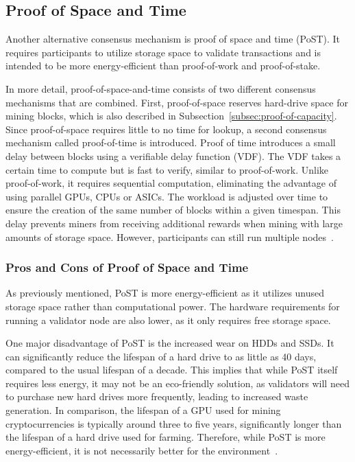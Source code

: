 \subsection{Proof of Space and Time}\label{subsec:proof-of-space-and-time}
Another alternative consensus mechanism is proof of space and time (PoST).
It requires participants to utilize storage space to validate transactions and is intended to be more energy-efficient than proof-of-work and proof-of-stake.

In more detail, proof-of-space-and-time consists of two different consensus mechanisms that are combined.
First, proof-of-space reserves hard-drive space for mining blocks, which is also described in Subsection~\ref{subsec:proof-of-capacity}.
Since proof-of-space requires little to no time for lookup, a second consensus mechanism called proof-of-time is introduced.
Proof of time introduces a small delay between blocks using a verifiable delay function (VDF).
The VDF takes a certain time to compute but is fast to verify, similar to proof-of-work.
Unlike proof-of-work, it requires sequential computation, eliminating the advantage of using parallel GPUs, CPUs or ASICs.
The workload is adjusted over time to ensure the creation of the same number of blocks within a given timespan.
This delay prevents miners from receiving additional rewards when mining with large amounts of storage space.
However, participants can still run multiple nodes~\cite{supraoracles-post,chia-whitepaper}.

\subsubsection{Pros and Cons of Proof of Space and Time}
As previously mentioned, PoST is more energy-efficient as it utilizes unused storage space rather than computational power.
The hardware requirements for running a validator node are also lower, as it only requires free storage space.

One major disadvantage of PoST is the increased wear on HDDs and SSDs.
It can significantly reduce the lifespan of a hard drive to as little as 40 days, compared to the usual lifespan of a decade.
This implies that while PoST itself requires less energy, it may not be an eco-friendly solution, as validators will need to purchase new hard drives more frequently, leading to increased waste generation.
In comparison, the lifespan of a GPU used for mining cryptocurrencies is typically around three to five years, significantly longer than the lifespan of a hard drive used for farming.
Therefore, while PoST is more energy-efficient, it is not necessarily better for the environment~\cite{euronews-chia, devicetest-gpu-lifespan, supraoracles-post}.

